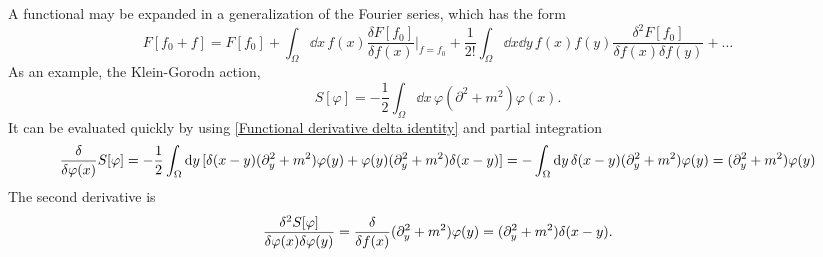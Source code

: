A functional may be expanded in a generalization of the Fourier series, which has the form
\begin{equation}
    F[f_0 + f] = F[f_0] + \int_\Omega \dd x \, f(x) \frac{\delta F[f_0]}{\delta f(x)}\bigg|_{f = f_0}
    + \frac{1}{2!}\int_\Omega \dd x \dd y \, f(x) f(y) \frac{\delta^2 F [f_0]}{\delta f(x) \delta f(y)}
    + \dots
\end{equation}
As an example, the Klein-Gorodn action,
\begin{equation}
    S[\varphi] = - \frac{1}{2}\int_\Omega \dd x \, \varphi (\partial^2 + m^2) \varphi(x).
\end{equation}
It can be evaluated quickly by using \autoref{Functional derivative delta identity} and partial integration
\begin{equation}
    \frac{\delta }{\delta \varphi(x)} S[\varphi] 
    = 
    - \frac{1}{2} \int_\Omega \dd y \, 
    [\delta(x - y)(\partial_y^2 + m^2)\varphi(y) + \varphi(y) (\partial_y^2 + m^2)\delta(x - y)]
    = 
    - \int_\Omega \dd y \, 
    \delta(x - y)(\partial_y^2 + m^2)\varphi(y)
    = (\partial_y^2 + m^2)\varphi(y)
\end{equation}
The second derivative is
\begin{equation}
    \frac{\delta^2S[\varphi]}{\delta \varphi(x)\delta \varphi(y)}
    =
    \frac{\delta }{\delta f(x)} (\partial_y^2 + m^2)\varphi(y)
    = 
    (\partial_y^2 + m^2) \delta(x - y).
\end{equation}


